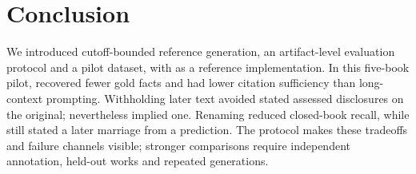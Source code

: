 \section{Conclusion}
\label{sec:conclusion}

We introduced cutoff-bounded reference generation, an artifact-level evaluation protocol
and a pilot dataset, with \sys as a reference implementation. In this five-book pilot,
\sys recovered fewer gold facts and had lower citation sufficiency than long-context
prompting. Withholding later text avoided stated assessed disclosures on the original;
\sys nevertheless implied one.\ifnwdecon{} Renaming reduced closed-book recall,
while \sys still stated a later marriage from a prediction.\fi{}
The protocol makes these tradeoffs and failure channels visible; stronger comparisons
require independent annotation, held-out works and repeated generations.
